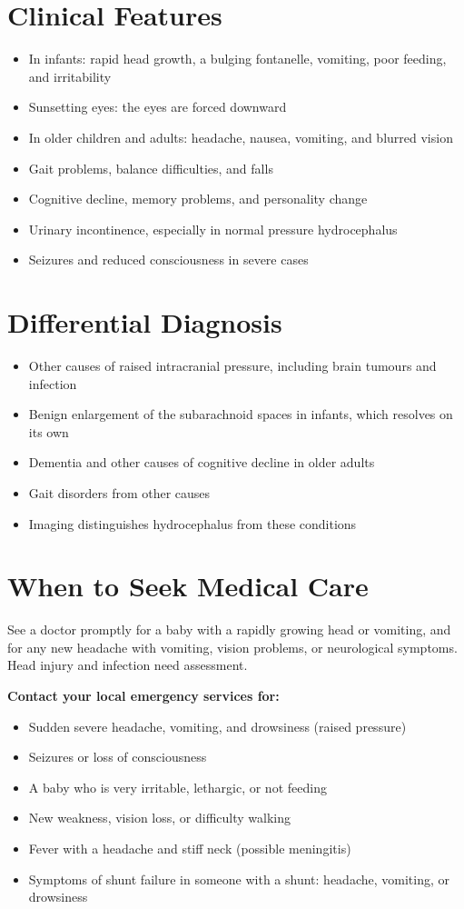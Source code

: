 \section*{Clinical Features}
\begin{itemize}
    \item In infants: rapid head growth, a bulging fontanelle, vomiting, poor feeding, and irritability
    \item Sunsetting eyes: the eyes are forced downward
    \item In older children and adults: headache, nausea, vomiting, and blurred vision
    \item Gait problems, balance difficulties, and falls
    \item Cognitive decline, memory problems, and personality change
    \item Urinary incontinence, especially in normal pressure hydrocephalus
    \item Seizures and reduced consciousness in severe cases
\end{itemize}

\section*{Differential Diagnosis}
\begin{itemize}
    \item Other causes of raised intracranial pressure, including brain tumours and infection
    \item Benign enlargement of the subarachnoid spaces in infants, which resolves on its own
    \item Dementia and other causes of cognitive decline in older adults
    \item Gait disorders from other causes
    \item Imaging distinguishes hydrocephalus from these conditions
\end{itemize}

\section*{When to Seek Medical Care}
See a doctor promptly for a baby with a rapidly growing head or vomiting, and for any new headache with vomiting, vision problems, or neurological symptoms. Head injury and infection need assessment.

\textbf{Contact your local emergency services for:}
\begin{itemize}
    \item Sudden severe headache, vomiting, and drowsiness (raised pressure)
    \item Seizures or loss of consciousness
    \item A baby who is very irritable, lethargic, or not feeding
    \item New weakness, vision loss, or difficulty walking
    \item Fever with a headache and stiff neck (possible meningitis)
    \item Symptoms of shunt failure in someone with a shunt: headache, vomiting, or drowsiness
\end{itemize}

